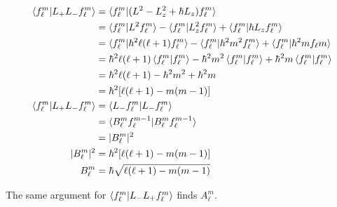 \documentclass{article}
\begin{document}
\begin{align*}
  \braket{f_\ell^m | L_+ L_- f_\ell^m} & = \braket{f_\ell^m | (L^2 - L_z^2 + \hbar L_z) f_\ell^m}                                                                                   \\
                                       & = \braket{f_\ell^m | L^2 f_\ell^m} - \braket{f_\ell^m | L_z^2 f_\ell^m} + \braket{f_\ell^m | \hbar L_z f_\ell^m}                           \\
                                       & = \braket{f_\ell^m | \hbar^2 \ell (\ell + 1) f_\ell^m} - \braket{f_\ell^m | \hbar^2 m^2 f_\ell^m} + \braket{f_\ell^m | \hbar^2 m f_\ell m} \\
                                       & = \hbar^2 \ell (\ell + 1) \braket{f_\ell^m | f_\ell^m} - \hbar^2 m^2 \braket{f_\ell^m | f_\ell^m} + \hbar^2 m \braket{f_\ell^m | f_\ell^m} \\
                                       & = \hbar^2 \ell (\ell + 1) - \hbar^2 m^2 + \hbar^2 m                                                                                        \\
                                       & = \hbar^2 [\ell (\ell + 1) - m (m - 1)]                                                                                                    \\
  \braket{f_\ell^m | L_+ L_- f_\ell^m} & = \braket{L_- f_\ell^m | L_- f_\ell^m}                                                                                                     \\
                                       & = \braket{B_\ell^m f_\ell^{m - 1} | B_\ell^m f_\ell^{m - 1}}                                                                               \\
                                       & = |B_\ell^m|^2                                                                                                                             \\
  |B_\ell^m|^2                         & = \hbar^2 [\ell (\ell + 1) - m (m - 1)]                                                                                                    \\
  B_\ell^m                             & = \hbar \sqrt{\ell (\ell + 1) - m (m - 1)}
\end{align*}

The same argument for $\braket{f_\ell^m | L_- L_+ f_\ell^m}$ finds $A_\ell^m$.

\subsection{}
\end{document}
